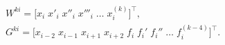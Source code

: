 \begin{equation}



















\end{equation}










\begin{gather}

\label{mvc:eq6}

   W^{ki}=\bigl[x_i\;x'_i\;x''_i\;x'''_i \;\dots\;x_i^{(k)}\bigr]^\top,

\\

\label{mvc:eq7}

   G^{ki}=\bigl[x_{i-2}\;x_{i-1}\;x_{i+1}\;x_{i+2}\;f_{i}\;f_{i}'\;f_{i}''\;\dots\; f_{i}^{(k-4)}\bigr]^\top.

\end{gather}


